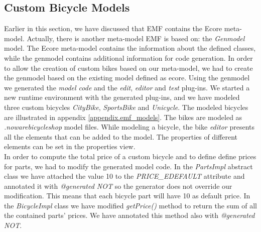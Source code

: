 \subsection{Custom Bicycle Models}
Earlier in this section, we have discussed that EMF contains the Ecore
meta-model. Actually, there is another meta-model EMF is based on:
the \emph{Genmodel} model. The Ecore meta-model contains the information about
the defined classes, while the genmodel contains additional information for
code generation. In order to allow the creation of custom bikes based on our
meta-model, we had to create the genmodel based on the existing model defined as
ecore. Using the genmodel we generated the \emph{model code} and the
\emph{edit}, \emph{editor} and \emph{test} plug-ins. We started a new runtime
environment with the generated plug-ins, and we have modeled three custom bicycles
\emph{CityBike}, \emph{SportsBike} and \emph{Unicycle}. The modeled bicycles are
illustrated in appendix \ref{appendix.emf_models}. The bikes are modeled as
\emph{.nowarebicycleshop} model files. While modeling a bicycle, the bike
\emph{editor} presents all the elements that can be added to the model. The
properties of different elements can be set in the properties view.\\

In order to compute the total price of a custom bicycle and to define define
prices for parts, we had to modify the generated model code. In the
\emph{PartsImpl} abstract class we have attached the value
10 to the \emph{PRICE\_EDEFAULT} attribute and annotated it with
\emph{@generated NOT} so the generator does not override our modification. This
means that each bicycle part will have 10 as default price. In the
\emph{BicycleImpl} class we have modified \emph{getPrice()} method to return the
sum of all the contained parts' prices. We have annotated this method also with
\emph{@generated NOT}.

